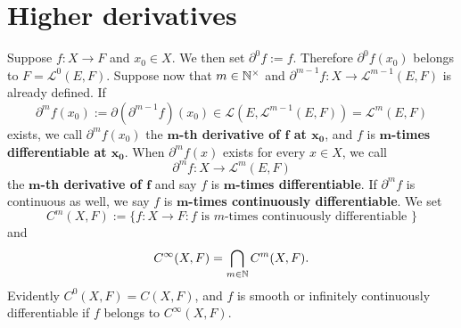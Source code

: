 \section{Higher derivatives}
\begin{definition}
Suppose $f:X\to F$ and $x_0 \in X$. We then set $\partial^0f:=f$. Therefore
$\partial^0f(x_0)$ belongs to $F=\mathcal{L}^0(E,F)$. Suppose now that $m\in\mathbb{N}^{\times}$ and $\partial^{m-1}f:X\to\mathcal{L}^{m-1}(E,F)$ is already defined. If
\[\partial^{m}f(x_0):=\partial(\partial^{m-1}f)(x_0)\in\mathcal{L}(E,\mathcal{L}^{m-1}(E,F))=\mathcal{L}^{m}(E,F)\]
exists, we call $\partial^{m}f(x_0)$ the \textbf{$\bm{m}$-th derivative of $\bm{f}$ at $\bm{x_0}$}, and $f$ is \textbf{$\bm{m}$-times differentiable at $\bm{x_0}$}. When $\partial^{m}f(x)$ exists for every $x\in X$, we call
\[\partial^{m}f:X\to\mathcal{L}^m(E,F)\]
the \textbf{$\bm{m}$-th derivative of $\bm{f}$} and say $f$ is \textbf{$\bm{m}$-times differentiable}. If $\partial^{m}f$ is continuous as well, we say $f$ is \textbf{$\bm{m}$-times continuously differentiable}. We set
\[C^m(X,F):=\{f:X\to F:\text{$f$ is $m$-times continuously differentiable }\}\]
and 
\[C^{\infty}(X,F)=\bigcap_{m\in\mathbb{N}}C^m(X,F).\]
Evidently $C^0(X,F)=C(X,F)$, and $f$ is smooth or infinitely continuously differentiable
if $f$ belongs to $C^{\infty}(X,F)$.
\end{definition}
